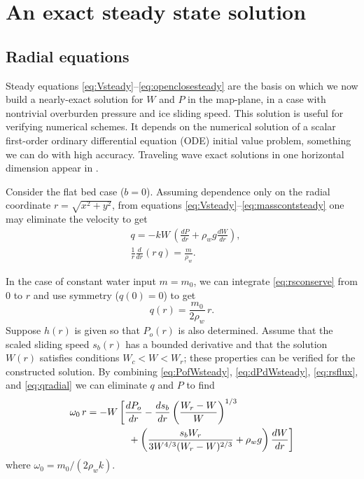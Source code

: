 \documentclass[gmd]{copernicus}   %
\begin{document}
\section{An exact steady state solution}  \label{sec:exactsolution}

\subsection{Radial equations}  Steady equations \eqref{eq:Vsteady}--\eqref{eq:openclosesteady} are the basis on which we now build a nearly-exact solution for $W$ and $P$ in the map-plane, in a case with nontrivial overburden pressure and ice sliding speed.  This solution is useful for verifying numerical schemes.  It depends on the numerical solution of a scalar first-order ordinary differential equation (ODE) initial value problem, something we can do with high accuracy.  Traveling wave exact solutions in one horizontal dimension appear in \cite{Schoofetal2012}.

Consider the flat bed case ($b=0$).  Assuming dependence only on the radial coordinate $r = \sqrt{x^2+y^2}$, from equations \eqref{eq:Vsteady}--\eqref{eq:masscontsteady} one may eliminate the velocity to get
\begin{align}
&q = - k W\, \left(\frac{dP}{dr} + \rho_w g \frac{dW}{dr}\right), \label{eq:rsflux} \\
&\frac{1}{r}\frac{d}{dr}\left(r\,q\right) = \frac{m}{\rho_w}. \label{eq:rsconserve}
\end{align}

In the case of constant water input $m = m_0$, we can integrate \eqref{eq:rsconserve} from $0$ to $r$ and use symmetry ($q(0)=0$) to get
\begin{equation}
q(r) = \frac{m_0}{2\rho_w} \, r. \label{eq:qradial}
\end{equation}
Suppose $h(r)$ is given so that $P_o(r)$ is also determined.  Assume that the scaled sliding speed $s_b(r)$ has a bounded derivative and that the solution $W(r)$ satisfies conditions $W_c < W < W_r$; these properties can be verified for the constructed solution.  By combining \eqref{eq:PofWsteady}, \eqref{eq:dPdWsteady}, \eqref{eq:rsflux}, and \eqref{eq:qradial} we can eliminate $q$ and $P$ to find
\begin{align}
&\omega_0\, r = - W\, \bigg[\frac{dP_o}{dr} - \frac{ds_b}{dr} \left(\frac{W_r - W}{W}\right)^{1/3}  \label{eq:WradialODE} \\
&\qquad \qquad \qquad + \left(\frac{s_b W_r}{3 W^{4/3} (W_r - W)^{2/3}} + \rho_w g\right) \frac{dW}{dr}\bigg] \notag
\end{align}
where $\omega_0 = m_0 / (2 \rho_w k)$.
\end{document}
